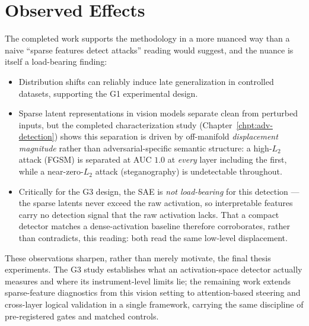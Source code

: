 \documentclass[../ppgc-tese.tex]{subfiles}
\begin{document}
\section{Observed Effects}
The completed work supports the methodology in a more nuanced way than a
naive ``sparse features detect attacks'' reading would suggest, and the nuance is
itself a load-bearing finding:
\begin{itemize}
    \item Distribution shifts can reliably induce late generalization in controlled
    datasets, supporting the G1 experimental design.
    \item Sparse latent representations in vision models separate clean from
    perturbed inputs, but the completed characterization study
    (Chapter~\ref{chpt:adv-detection}) shows this separation is driven by
    off-manifold \emph{displacement magnitude} rather than adversarial-specific
    semantic structure: a high-$L_2$ attack (FGSM) is separated at AUC $1.0$ at
    \emph{every} layer including the first, while a near-zero-$L_2$ attack
    (steganography) is undetectable throughout.
    \item Critically for the G3 design, the SAE is \emph{not load-bearing} for this
    detection --- the sparse latents never exceed the raw activation, so
    interpretable features carry no detection signal that the raw activation lacks.
    That a compact detector matches a dense-activation baseline therefore
    corroborates, rather than contradicts, this reading: both read the same
    low-level displacement.
\end{itemize}

These observations sharpen, rather than merely motivate, the final thesis
experiments. The G3 study establishes what an activation-space detector actually
measures and where its instrument-level limits lie; the remaining work extends
sparse-feature diagnostics from this vision setting to attention-based steering and
cross-layer logical validation in a single framework, carrying the same discipline
of pre-registered gates and matched controls.
\end{document}
